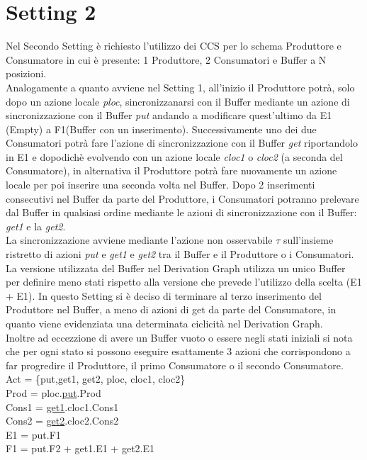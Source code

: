 \documentclass{article}
\begin{document}
\section{Setting 2}
Nel Secondo Setting è richiesto l'utilizzo dei CCS per lo schema Produttore e Consumatore in cui è presente: 1 Produttore, 2 Consumatori e Buffer a N posizioni.
\\Analogamente a quanto avviene nel Setting 1, all'inizio il Produttore potrà, solo dopo un azione locale \textit{ploc}, sincronizzanarsi con il Buffer mediante un azione di sincronizzazione con il Buffer \textit{put} andando a modificare quest'ultimo da E1 (Empty) a F1(Buffer con un inserimento). Successivamente uno dei due Consumatori potrà fare l'azione di sincronizzazione con il Buffer \textit{get} riportandolo in E1 e dopodichè evolvendo con un azione locale \textit{cloc1} o \textit{cloc2} (a seconda del Consumatore), in alternativa il Produttore potrà fare nuovamente un azione locale per poi inserire una seconda volta nel Buffer. Dopo 2 inserimenti consecutivi nel Buffer da parte del Produttore, i Consumatori potranno prelevare dal Buffer in qualsiasi ordine mediante le azioni di sincronizzazione con il Buffer: \textit{get1} e la \textit{get2}.
\\La sincronizzazione avviene mediante l'azione non osservabile $\tau$ sull'insieme ristretto di azioni \textit{put} e \textit{get1} e \textit{get2} tra il Buffer e il Produttore o i Consumatori.
\\La versione utilizzata del Buffer nel Derivation Graph utilizza un unico Buffer per definire meno stati rispetto alla versione che prevede l'utilizzo della scelta (E1 + E1).
In questo Setting si è deciso di terminare al terzo inserimento del Produttore nel Buffer, a meno di azioni di {get} da parte del Consumatore, in quanto viene evidenziata una determinata ciclicità nel Derivation Graph.
\\Inoltre ad eccezzione di avere un Buffer vuoto o essere negli stati iniziali si nota che per ogni stato si possono eseguire esattamente 3 azioni che corrispondono a far progredire il Produttore, il primo Consumatore o il secondo Consumatore.
\\Act = \{put,get1, get2, ploc, cloc1, cloc2\}
\\Prod = ploc.\underline{put}.Prod
\\Cons1 = \underline{get1}.cloc1.Cons1
\\Cons2 = \underline{get2}.cloc2.Cons2
\\E1 = put.F1
\\F1 = put.F2 + get1.E1 + get2.E1
\end{document}
